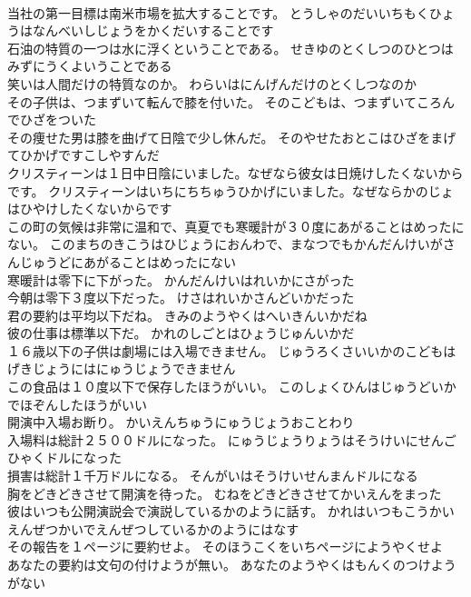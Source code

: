 \documentclass[8pt]{extreport}
\begin{document}
\begin{CJK}{UTF8}{min}
\\	当社の第一目標は南米市場を拡大することです。	とうしゃのだいいちもくひょうはなんべいしじょうをかくだいすることです 
\\	石油の特質の一つは水に浮くということである。	せきゆのとくしつのひとつはみずにうくよいうことである 
\\	笑いは人間だけの特質なのか。	わらいはにんげんだけのとくしつなのか 
\\	その子供は、つまずいて転んで膝を付いた。	そのこどもは、つまずいてころんでひざをついた 
\\	その痩せた男は膝を曲げて日陰で少し休んだ。	そのやせたおとこはひざをまげてひかげですこしやすんだ 
\\	クリスティーンは１日中日陰にいました。なぜなら彼女は日焼けしたくないからです。	クリスティーンはいちにちちゅうひかげにいました。なぜならかのじょはひやけしたくないからです 
\\	この町の気候は非常に温和で、真夏でも寒暖計が３０度にあがることはめったにない。	このまちのきこうはひじょうにおんわで、まなつでもかんだんけいがさんじゅうどにあがることはめったにない 
\\	寒暖計は零下に下がった。	かんだんけいはれいかにさがった 
\\	今朝は零下３度以下だった。	けさはれいかさんどいかだった 
\\	君の要約は平均以下だね。	きみのようやくはへいきんいかだね 
\\	彼の仕事は標準以下だ。	かれのしごとはひょうじゅんいかだ 
\\	１６歳以下の子供は劇場には入場できません。	じゅうろくさいいかのこどもはげきじょうにはにゅうじょうできません 
\\	この食品は１０度以下で保存したほうがいい。	このしょくひんはじゅうどいかでほぞんしたほうがいい 
\\	開演中入場お断り。	かいえんちゅうにゅうじょうおことわり 
\\	入場料は総計２５００ドルになった。	にゅうじょうりょうはそうけいにせんごひゃくドルになった 
\\	損害は総計１千万ドルになる。	そんがいはそうけいせんまんドルになる 
\\	胸をどきどきさせて開演を待った。	むねをどきどきさせてかいえんをまった 
\\	彼はいつも公開演説会で演説しているかのように話す。	かれはいつもこうかいえんぜつかいでえんぜつしているかのようにはなす 
\\	その報告を１ページに要約せよ。	そのほうこくをいちページにようやくせよ 
\\	あなたの要約は文句の付けようが無い。	あなたのようやくはもんくのつけようがない 

\end{CJK}
\end{document}
